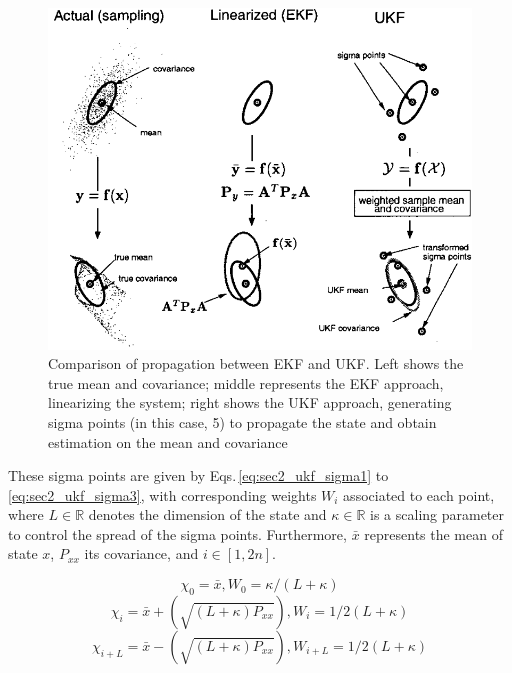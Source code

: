 \documentclass[10pt,twocolumn]{IEEEtran}
\begin{document}
\begin{figure}[ht]
    \centering
    \includegraphics[width = 1\linewidth]{ekf_vs_ukf.png}
    \caption[Comparison of propagation between EKF and UKF]{Comparison of propagation between EKF and UKF. Left shows the true mean and covariance; middle represents the EKF approach, linearizing the system; right shows the UKF approach, generating sigma points (in this case, 5) to propagate the state and obtain estimation on the mean and covariance}
    \label{fig:w15_ekf_vs_ukf}
\end{figure}

These sigma points are given by Eqs.\,\eqref{eq:sec2_ukf_sigma1} to \eqref{eq:sec2_ukf_sigma3}, with corresponding weights $W_i$ associated to each point, where $L \in \mathbb{R}$ denotes the dimension of the state and $\kappa \in \mathbb{R}$ is a scaling parameter to control the spread of the sigma points. Furthermore, $\bar{x}$ represents the mean of state $x$, $P_{xx}$ its covariance, and $i \in [1,2n]$.

\begin{equation}
    \label{eq:sec2_ukf_sigma1}
    \chi_0 = \bar{x}, W_0 = \kappa /(L+\kappa)
\end{equation}
\begin{equation}
    \label{eq:sec2_ukf_sigma2}
    \chi_i = \bar{x} + \left( \sqrt{(L+\kappa)P_{xx}} \right), W_i = 1/2(L+\kappa)
\end{equation}
\begin{equation}
    \label{eq:sec2_ukf_sigma3}
    \chi_{i+L} = \bar{x} - \left( \sqrt{(L+\kappa)P_{xx}} \right), W_{i+L} = 1/2(L+\kappa)
\end{equation}
\end{document}
